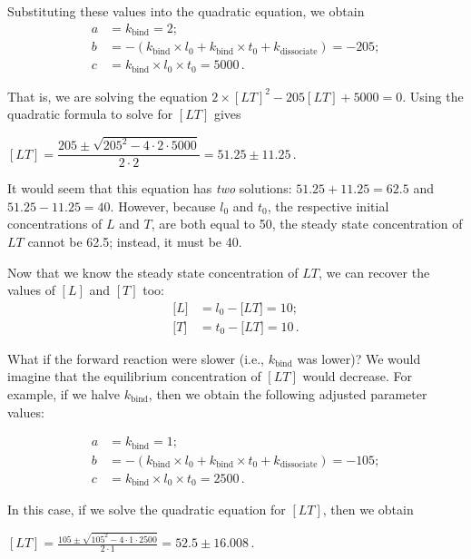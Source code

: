 \noindent Substituting these values into the quadratic equation, we obtain
\begin{align*}
a & = k_\text{bind} = 2;\\
b & = - (k_\text{bind} \times l_0 + k_\text{bind} \times t_0 + k_\text{dissociate}) = -205;\\
c & = k_\text{bind} \times l_0 \times t_0 = 5000\,.
\end{align*}

\noindent That is, we are solving the equation $2 \times [LT]^2 - 205 [LT] + 5000 = 0$. Using the quadratic formula to solve for $[LT]$ gives

\begin{center}
$[LT] = \dfrac{205 \pm \sqrt{205^2 - 4 \cdot 2 \cdot 5000}}{2 \cdot 2} = 51.25 \pm 11.25\,.$
\end{center}

It would seem that this equation has \textit{two} solutions: $51.25 + 11.25 = 62.5$ and $51.25 - 11.25 = 40$. However, because $l_0$ and $t_0$, the respective initial concentrations of $L$ and $T$, are both equal to 50, the steady state concentration of $LT$ cannot be 62.5; instead, it must be 40.

Now that we know the steady state concentration of $LT$, we can recover the values of $[L]$ and $[T]$ too:
\begin{align*}
\text{[}L\text{]} & = l_0 - \text{[}LT\text{]} = 10;\\
\text{[}T\text{]} & = t_0 - \text{[}LT\text{]} = 10\,.
\end{align*}

What if the forward reaction were slower (i.e., $k_\text{bind}$ was lower)? We would imagine that the equilibrium concentration of $[LT]$ would decrease. For example, if we halve $k_\text{bind}$, then we obtain the following adjusted parameter values:

\begin{align*}
a & = k_\text{bind} = 1;\\
b & = - (k_\text{bind} \times l_0 + k_\text{bind} \times t_0 + k_\text{dissociate}) = -105;\\
c & = k_\text{bind} \times l_0 \times t_0 = 2500\,.
\end{align*}

In this case, if we solve the quadratic equation for $[LT]$, then we obtain

\begin{center}
$[LT] = \frac{105 \pm \sqrt{105^2 - 4 \cdot 1 \cdot 2500}}{2 \cdot 1} = 52.5 \pm 16.008\,.$
\end{center}

